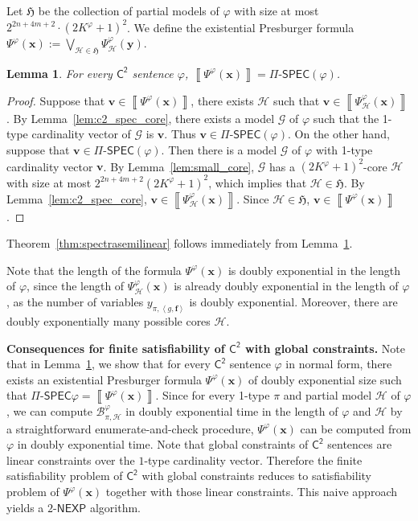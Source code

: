 \documentclass[10pt,a4paper]{article}
\newtheorem{lemma}[theorem]{Lemma}
\theoremstyle{definition}
\theoremstyle{remark}
\newcommand{\myparagraph}[1]{\medskip\noindent \textbf{#1.}}
\newcommand{\cB}{\mathcal{B}}
\newcommand{\cG}{\mathcal{G}}
\newcommand{\cH}{\mathcal{H}}
\newcommand{\bff}{\mathbf{f}}
\newcommand{\bfv}{\mathbf{v}}
\newcommand{\bfx}{\mathbf{x}}
\newcommand{\bfy}{\mathbf{y}}
\newcommand{\nexp}  {\mathsf{NEXP}}
\newcommand{\Ctwo}    {\mathsf{C^2}}
\newcommand{\tuple}[1]       {\left\langle #1 \right\rangle}
\newcommand{\sol}[1] {\left\llbracket #1 \right\rrbracket}
\newcommand{\pispec} {\Pi\text{-}\mathsf{SPEC}}
\begin{document}
Let $\mathfrak{H}$ be the collection of partial models of $\varphi$ with size at most $2^{2n+4m+2} \cdot (2K^\varphi+1)^2$.
We define the existential Presburger formula 
$\Psi^\varphi(\bfx)
 := 
\bigvee_{\cH \in \mathfrak{H}}
\Psi^\varphi_{\cH}(\bfy).$

\begin{lemma}\label{thm:c2_spec}
    For every $\Ctwo$ sentence $\varphi$,
    $\sol{\Psi^\varphi(\bfx)} = \pispec(\varphi)$.
\end{lemma}

\begin{proof}
    Suppose that $\bfv \in \sol{\Psi^\varphi(\bfx)}$,
    there exists $\cH$ such that $\bfv \in \sol{\Psi^\varphi_\cH(\bfx)}$.
    By Lemma~\ref{lem:c2_spec_core},
    there exists a model $\cG$ of $\varphi$ such that the 1-type cardinality vector of $\cG$ is $\bfv$.
    Thus $\bfv \in \pispec(\varphi)$.
    On the other hand, suppose that $\bfv \in \pispec(\varphi)$.
    Then there is a model $\cG$ of $\varphi$ with 1-type cardinality vector  $\bfv$.
    By Lemma~\ref{lem:small_core}, $\cG$ has a $(2K^\varphi+1)^2$-core $\cH$ with size at most $2^{2n+4m+2}(2K^\varphi+1)^2$,
    which implies that $\cH \in \mathfrak{H}$.
    By Lemma~\ref{lem:c2_spec_core},
    $\bfv \in \sol{\Psi^\varphi_\cH(\bfx)}$.
    Since $\cH \in \mathfrak{H}$,
    $\bfv \in \sol{\Psi^\varphi(\bfx)}$.
\end{proof}

Theorem~\ref{thm:spectrasemilinear} follows immediately from Lemma~\ref{thm:c2_spec}.

Note that the length of the formula $\Psi^\varphi(\bfx)$ is doubly exponential in the length of $\varphi$,
since the length of $\Psi^\varphi_\cH(\bfx)$ is already doubly exponential in the length of $\varphi$, 
as the number of variables $y_{\pi, \tuple{g, \bff}}$ is doubly exponential.
Moreover, there are doubly exponentially many possible cores $\cH$.

\myparagraph{Consequences for finite satisfiability of $\Ctwo$ with global constraints}
Note that in Lemma~\ref{thm:c2_spec},
we show that for every $\Ctwo$ sentence $\varphi$ in normal form,
there exists an existential Presburger formula $\Psi^\varphi(\bfx)$ of doubly exponential size 
such that $\pispec{\varphi} = \sol{\Psi^\varphi(\bfx)}$.
Since for every 1-type $\pi$ and partial model $\cH$ of $\varphi$, we can compute $\cB^{\varphi}_{\pi, \cH}$ in doubly exponential time in the length of $\varphi$ and $\cH$ by a straightforward enumerate-and-check procedure,
$\Psi^\varphi(\bfx)$ can be computed from $\varphi$ in doubly exponential time.
Note that global constraints of $\Ctwo$ sentences are linear constraints over the $1$-type cardinality vector.
Therefore the finite satisfiability problem of $\Ctwo$ with global constraints reduces
to satisfiability problem of $\Psi^\varphi(\bfx)$ together with those linear constraints.
This naive approach yields a $2\text{-}\nexp$ algorithm.
\end{document}
